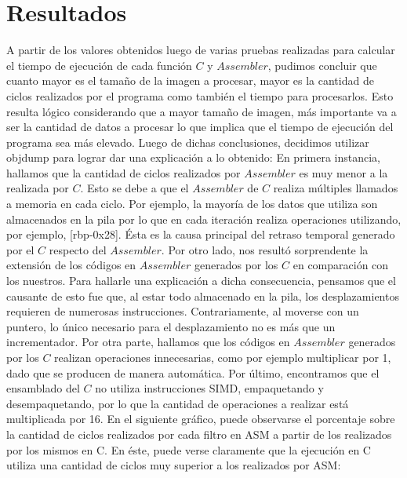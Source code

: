 \documentclass[10pt, a4paper]{article}
\begin{document}
\section{Resultados}
A partir de los valores obtenidos luego de varias pruebas realizadas para calcular el tiempo de ejecución de cada función $C$ y $Assembler$, pudimos concluir que cuanto mayor es el tamaño de la imagen a procesar, mayor es la cantidad de ciclos realizados por el programa como también el tiempo para procesarlos. Esto resulta lógico considerando que a mayor tamaño de imagen, más importante va a ser la cantidad de datos a procesar lo que implica que el tiempo de ejecución del programa sea más elevado.\newline
Luego de dichas conclusiones, decidimos utilizar objdump para lograr dar una explicación a lo obtenido:\newline
En primera instancia, hallamos que la cantidad de ciclos realizados por $Assembler$ es muy menor a la realizada por $C$. Esto se debe a que el $Assembler$ de $C$ realiza múltiples llamados a memoria en cada ciclo. Por ejemplo, la mayoría de los datos que utiliza son almacenados en la pila por lo que en cada iteración realiza operaciones utilizando, por ejemplo, [rbp-0x28]. Ésta es la causa principal del retraso temporal generado por el $C$ respecto del $Assembler$. \newline 
Por otro lado, nos resultó sorprendente la extensión de los códigos en $Assembler$ generados por los $C$ en comparación con los nuestros. Para hallarle una explicación a dicha consecuencia, pensamos que el causante de esto fue que, al estar todo almacenado en la pila, los desplazamientos requieren de numerosas instrucciones. Contrariamente, al moverse con un puntero, lo único necesario para el desplazamiento no es más que un incrementador. \newline
Por otra parte, hallamos que los códigos en $Assembler$ generados por los $C$ realizan operaciones innecesarias, como por ejemplo multiplicar por 1, dado que se producen de manera automática.\newline
Por último, encontramos que el ensamblado del $C$ no utiliza instrucciones SIMD, empaquetando y desempaquetando, por lo que la cantidad de operaciones a realizar está multiplicada por 16.\newline
En el siguiente gráfico, puede observarse el porcentaje sobre la cantidad de ciclos realizados por cada filtro en ASM a partir de los realizados por los mismos en C. En éste, puede verse claramente que la ejecución en C utiliza una cantidad de ciclos muy superior a los realizados por ASM:\newline
\end{document}
